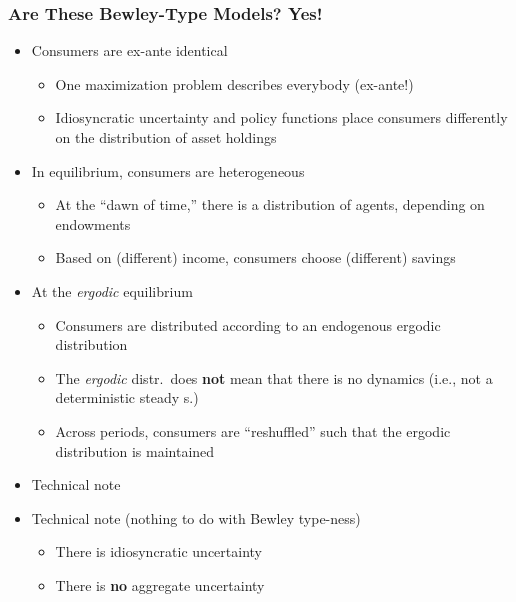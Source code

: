 \documentclass[10pt, aspectratio=1610, natbib, handout]{beamer}
\begin{document}
  \begin{frame}
    \frametitle{Are These Bewley-Type Models? Yes!}

    \begin{itemize}
      \item Consumers are ex-ante identical
        \begin{itemize}
          \item One maximization problem describes everybody (ex-ante!)
          \item Idiosyncratic uncertainty and policy functions place consumers differently on the distribution of asset holdings
        \end{itemize}

      \vfill\pause

      \item In equilibrium, consumers are heterogeneous
        \begin{itemize}
          \item At the ``dawn of time,'' there is a distribution of agents, depending on endowments
          \item Based on (different) income, consumers choose (different) savings
        \end{itemize}

      \vfill\pause

      \item At the \textit{ergodic} equilibrium
        \begin{itemize}
          \item Consumers are distributed according to an endogenous ergodic distribution
          \item The \textit{ergodic} distr.~does \textbf{not} mean that there is no dynamics (i.e., not a deterministic steady s.)
          \item Across periods, consumers are ``reshuffled'' such that the ergodic distribution is maintained
        \end{itemize}

      \vfill\pause

      \item Technical note
      \item Technical note (nothing to do with Bewley type-ness)
        \begin{itemize}
          \item There is idiosyncratic uncertainty
          \item There is \textbf{no} aggregate uncertainty
        \end{itemize}
    \end{itemize}

  \end{frame}
\end{document}

